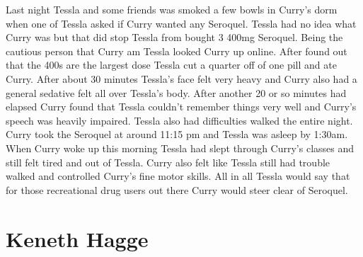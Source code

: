\documentclass[12pt]{book}
\begin{document}
Last night Tessla and some friends was smoked a few bowls in Curry's dorm when one of Tessla asked if Curry wanted any Seroquel. Tessla had no idea what Curry was but that did stop Tessla from bought 3 400mg Seroquel. Being the cautious person that Curry am Tessla looked Curry up online. After found out that the 400s are the largest dose Tessla cut a quarter off of one pill and ate Curry. After about 30 minutes Tessla's face felt very heavy and Curry also had a general sedative felt all over Tessla's body. After another 20 or so minutes had elapsed Curry found that Tessla couldn't remember things very well and Curry's speech was heavily impaired. Tessla also had difficulties walked the entire night. Curry took the Seroquel at around 11:15 pm and Tessla was asleep by 1:30am. When Curry woke up this morning Tessla had slept through Curry's classes and still felt tired and out of Tessla. Curry also felt like Tessla still had trouble walked and controlled Curry's fine motor skills. All in all Tessla would say that for those recreational drug users out there Curry would steer clear of Seroquel.



\chapter{Keneth Hagge}
\end{document}
